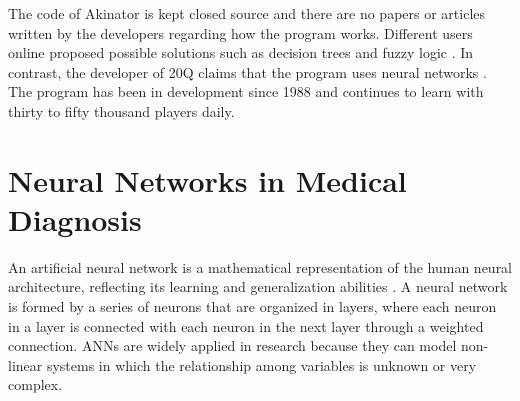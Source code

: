 The code of Akinator is kept closed source and there are no papers or articles written by the developers regarding how the program works.
Different users online proposed possible solutions such as decision trees \cite{allain:2013} and fuzzy logic \cite{chan:2014}.
In contrast, the developer of 20Q claims that the program uses neural networks  \cite{schrock:2006}.
The program has been in development since 1988 and continues to learn with thirty to fifty thousand players daily.

\section{Neural Networks in Medical Diagnosis}
An artificial neural network is a mathematical representation of the human neural architecture, reflecting its learning and generalization abilities \cite{amato:2013}.
A neural network is formed by a series of neurons that are organized in layers, where each neuron in a layer is connected with each neuron in the next layer through a weighted connection.
ANNs are widely applied in research because they can model non-linear systems in which the relationship among variables is unknown or very complex.


